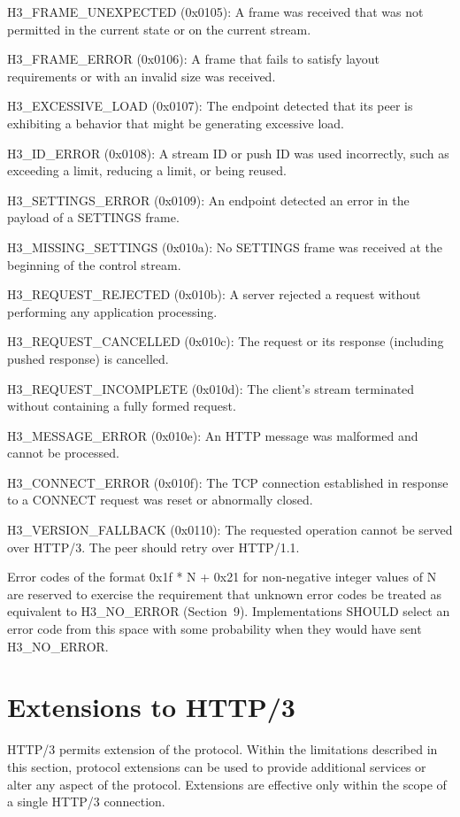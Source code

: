 \documentclass{article}
\begin{document}
H3\_FRAME\_UNEXPECTED (0x0105):  A frame was received that was not permitted in the current state or on the current stream.

H3\_FRAME\_ERROR (0x0106):  A frame that fails to satisfy layout requirements or with an invalid size was received.

H3\_EXCESSIVE\_LOAD (0x0107):  The endpoint detected that its peer is exhibiting a behavior that might be generating excessive load.

H3\_ID\_ERROR (0x0108):  A stream ID or push ID was used incorrectly, such as exceeding a limit, reducing a limit, or being reused.

H3\_SETTINGS\_ERROR (0x0109):  An endpoint detected an error in the payload of a SETTINGS frame.

H3\_MISSING\_SETTINGS (0x010a):  No SETTINGS frame was received at the beginning of the control stream.

H3\_REQUEST\_REJECTED (0x010b):  A server rejected a request without performing any application processing.

H3\_REQUEST\_CANCELLED (0x010c):  The request or its response (including pushed response) is cancelled.

H3\_REQUEST\_INCOMPLETE (0x010d):  The client's stream terminated without containing a fully formed request.

H3\_MESSAGE\_ERROR (0x010e):  An HTTP message was malformed and cannot be processed.

H3\_CONNECT\_ERROR (0x010f):  The TCP connection established in response to a CONNECT request was reset or abnormally closed.

H3\_VERSION\_FALLBACK (0x0110):  The requested operation cannot be served over HTTP/3.  The peer should retry over HTTP/1.1.

Error codes of the format 0x1f * N + 0x21 for non-negative integer values of N are reserved to exercise the requirement that unknown error codes be treated as equivalent to H3\_NO\_ERROR (Section~9). Implementations SHOULD select an error code from this space with some probability when they would have sent H3\_NO\_ERROR.

\section{Extensions to HTTP/3}

HTTP/3 permits extension of the protocol.  Within the limitations described in this section, protocol extensions can be used to provide additional services or alter any aspect of the protocol.  Extensions are effective only within the scope of a single HTTP/3 connection.
\end{document}
